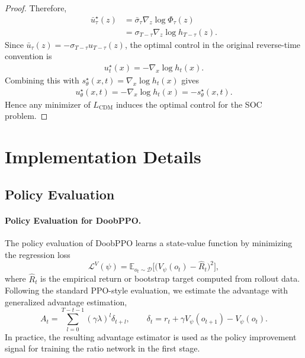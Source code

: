 \begin{proof}
Therefore,
\begin{align*}
    \bar u_\tau^\star(z)
    &=
    \bar\sigma_\tau\nabla_z\log \Phi_\tau(z)
    \\
    &=
    \sigma_{T-\tau}\nabla_z\log h_{T-\tau}(z).
\end{align*}
Since $\bar u_\tau(z)=-\sigma_{T-\tau}u_{T-\tau}(z)$, the optimal control in the original reverse-time convention is
\begin{align*}
    u_t^\star(x)
    =
    -\nabla_x\log h_t(x).
\end{align*}
Combining this with $s_\theta^\star(x,t)=\nabla_x\log h_t(x)$ gives
\begin{align*}
    u_\theta^\star(x,t)
    =
    -\nabla_x\log h_t(x)
    =
    -s_\theta^\star(x,t)
    .
\end{align*}
Hence any minimizer of $L_{\mathrm{CDM}}$ induces the optimal control for the SOC problem.
\end{proof}















\section{Implementation Details}
\label{sec:implementation}

\subsection{Policy Evaluation}

\paragraph{Policy Evaluation for DoobPPO.}
The policy evaluation of DoobPPO learns a state-value function by minimizing the regression loss
\begin{equation}
\mathcal{L}^{V}(\psi)
=
\mathbb{E}_{o_t \sim \mathcal{D}}
\Big[
\big(V_\psi(o_t)-\hat{R}_t\big)^2
\Big],
\end{equation}
where $\hat{R}_t$ is the empirical return or bootstrap target computed from rollout data.
Following the standard PPO-style evaluation, we estimate the advantage with generalized advantage estimation,
\begin{equation}
A_t=\sum_{l=0}^{T-t-1}(\gamma\lambda)^l \delta_{t+l},
\qquad
\delta_t=r_t+\gamma V_\psi(o_{t+1})-V_\psi(o_t).
\end{equation}
In practice, the resulting advantage estimator is used as the policy improvement signal for training the ratio network in the first stage.

